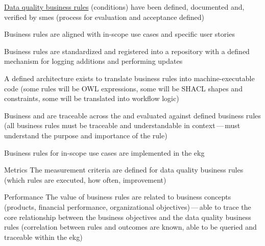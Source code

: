\kgmmscoringsection

\kgmmscoringlevelOne

\begin{scoring}

  \item \hyperref[sec:ekg-mm-data-quality-business-rules]{Data quality business rules} (conditions) have been defined,
        documented and, verified by \glspl{sme} (process for evaluation and acceptance defined)
  \item Business rules are aligned with in-scope use cases and specific user stories
  \item Business rules are standardized and registered into a repository with a defined mechanism for logging
        additions and performing updates

\end{scoring}

\kgmmscoringlevelTwo

\begin{scoring}

  \item A defined architecture exists to translate business rules into machine-executable code (some rules will be
        OWL expressions, some will be SHACL shapes and constraints, some will be translated into
        workflow logic)
  \item Business  and  are traceable across the  and
        evaluated against defined business rules (all business rules must be traceable and understandable in
        context\,---\,must understand the purpose and importance of the rule)
  \item Business rules for in-scope use cases are implemented in the \gls{ekg}

\end{scoring}

\kgmmscoringlevelThree

\begin{scoring}

    \item [Metrics] The measurement criteria are defined for data quality business rules (which rules are executed,
          how often, improvement)
    \item [Performance] The value of business rules are related to business concepts (products, financial performance,
          organizational objectives)\,---\,able to trace the core relationship between the business objectives and
          the data quality business rules (correlation between rules and outcomes are known, able to be queried and
          traceable within the \gls{ekg})

\end{scoring}

